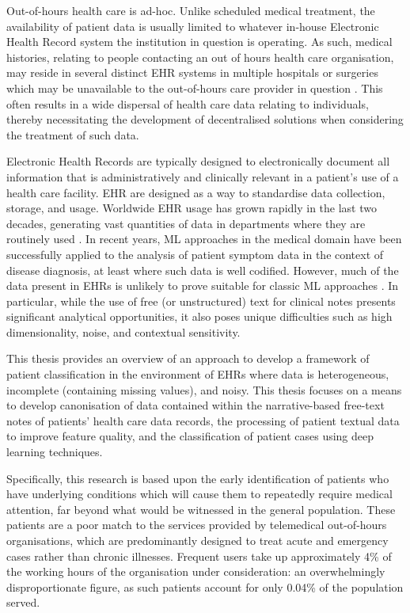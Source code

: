 Out-of-hours health care is ad-hoc. Unlike scheduled medical treatment, the availability of patient data is usually limited to whatever in-house Electronic Health Record system the institution in question is operating. As such, medical histories, relating to people contacting an out of hours health care organisation, may reside in several distinct EHR systems in multiple hospitals or surgeries which may be unavailable to the out-of-hours care provider in question \cite{warner2019s}. This often results in a wide dispersal of health care data relating to individuals, thereby necessitating the development of decentralised solutions when considering the treatment of such data.

Electronic Health Records are typically designed to electronically document all information that is administratively and clinically relevant in a patient's use of a health care facility. EHR are designed as a way to standardise data collection, storage, and usage. Worldwide EHR usage has grown rapidly in the last two decades, generating vast quantities of data in departments where they are routinely used \cite{safran2014reuse}. In recent years, ML approaches in the medical domain have been successfully applied to the analysis of patient symptom data in the context of disease diagnosis, at least where such data is well codified. However, much of the data present in EHRs is unlikely to prove suitable for classic ML approaches \cite{harutyunyan2017multitask}. In particular, while the use of free (or unstructured) text for clinical notes presents significant analytical opportunities, it also poses unique difficulties such as high dimensionality, noise, and contextual sensitivity. 

 
 
 This thesis provides an overview of an approach to develop a framework of patient classification in the environment of EHRs where data is heterogeneous, incomplete (containing missing values), and noisy. This thesis focuses on a means to develop canonisation of data contained within the narrative-based free-text notes of patients' health care data records, the processing of patient textual data to improve feature quality, and the classification of patient cases using deep learning techniques. 
 
 Specifically, this research is based upon the early identification of patients who have underlying conditions which will cause them to repeatedly require medical attention, far beyond what would be witnessed in the general population. These patients are a poor match to the services provided by telemedical out-of-hours organisations, which are predominantly designed to treat acute and emergency cases rather than chronic illnesses. Frequent users take up approximately 4\% of the working hours of the organisation under consideration: an overwhelmingly disproportionate figure, as such patients account for only 0.04\%  of the population served. 
 
